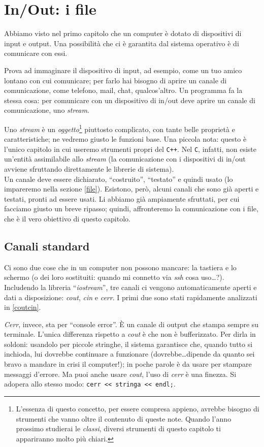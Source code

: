 \chapter{In/Out: i file}\label{inout}
Abbiamo visto nel primo capitolo che un computer è dotato di dispositivi di input e output. Una possibilità che ci è garantita dal sistema operativo è di comunicare con essi.

Prova ad immaginare il dispositivo di input, ad esempio, come un tuo amico lontano con cui comunicare; per farlo hai bisogno di aprire un canale di comunicazione, come telefono, mail, chat, qualcos'altro. Un programma fa la stessa cosa: per comunicare con un dispositivo di in/out deve aprire un canale di comunicazione, uno \emph{stream}.

Uno \emph{stream} è un \emph{oggetto}\footnote{L'essenza di questo concetto, per essere compresa appieno, avrebbe bisogno di strumenti che vanno oltre il contenuto di queste note. Quando l'anno prossimo studierai le \emph{classi}, diversi strumenti di questo capitolo ti appariranno molto più chiari.} piuttosto complicato, con tante belle proprietà e caratteristiche; ne vedremo giusto le funzioni base. Una piccola nota: questo è l'unico capitolo in cui useremo strumenti propri del \verb|C++|. Nel \verb|C|, infatti, non esiste un'entità assimilabile allo \emph{stream} (la comunicazione con i dispositivi di in/out avviene sfruttando direttamente le librerie di sistema).\\

Un canale deve essere dichiarato, ``costruito'', ``testato'' e quindi usato (lo impareremo nella sezione \ref{file}). Esistono, però, alcuni canali che sono già aperti e testati, pronti ad essere usati. Li abbiamo già ampiamente  sfruttati, per cui facciamo giusto un breve ripasso; quindi, affronteremo la comunicazione con i file, che è il vero obiettivo di questo capitolo.

\section{Canali standard}
Ci sono due cose che in un computer non possono mancare: la tastiera e lo schermo (o dei loro sostituiti: quando mi connetto via \emph{ssh} cosa uso\ldots?). Includendo la libreria ``\emph{iostream}'', tre canali ci vengono automaticamente aperti e dati a disposizione: \emph{cout}, \emph{cin} e \emph{cerr}. I primi due sono stati rapidamente analizzati in \ref{coutcin}. 

\emph{Cerr}, invece, sta per ``console error''. È un canale di output che stampa sempre su terminale. L'unica differenza rispetto a \emph{cout} è che non è bufferizzato. Per dirla in soldoni: usandolo per piccole stringhe, il sistema garantisce che, quando tutto si inchioda, lui dovrebbe continuare a funzionare (dovrebbe\ldots dipende da quanto sei bravo a mandare in crisi il computer!); in poche parole è da usare per stampare messaggi d'errore. Ma puoi anche usare \emph{cout}, l'uso di \emph{cerr} è una finezza. Si adopera allo stesso modo: \lstinline|cerr << stringa << endl;|.\\

